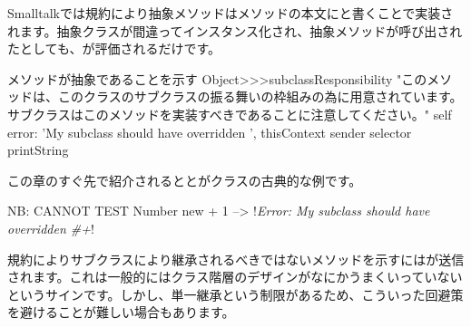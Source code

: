 \documentclass[a4paper,10pt,twoside]{book}
\begin{document}
Smalltalkでは規約により抽象メソッドはメソッドの本文にと書くことで実装されます。抽象クラスが間違ってインスタンス化され、抽象メソッドが呼び出されたとしても、が評価されるだけです。

\begin{method}{メソッドが抽象であることを示す}
Object>>>subclassResponsibility
    "このメソッドは、このクラスのサブクラスの振る舞いの枠組みの為に用意されています。
    サブクラスはこのメソッドを実装すべきであることに注意してください。"
    self error: 'My subclass should have overridden ', thisContext sender selector printString
\end{method}

この章のすぐ先で紹介されるととがクラスの古典的な例です。

\begin{code}{NB: CANNOT TEST}
Number new + 1 --> !\emph{Error: My subclass should have overridden \#+}!
\end{code}

規約によりサブクラスにより継承されるべきではないメソッドを示すにはが送信されます。これは一般的にはクラス階層のデザインがなにかうまくいっていないというサインです。しかし、単一継承という制限があるため、こういった回避策を避けることが難しい場合もあります。
\end{document}
